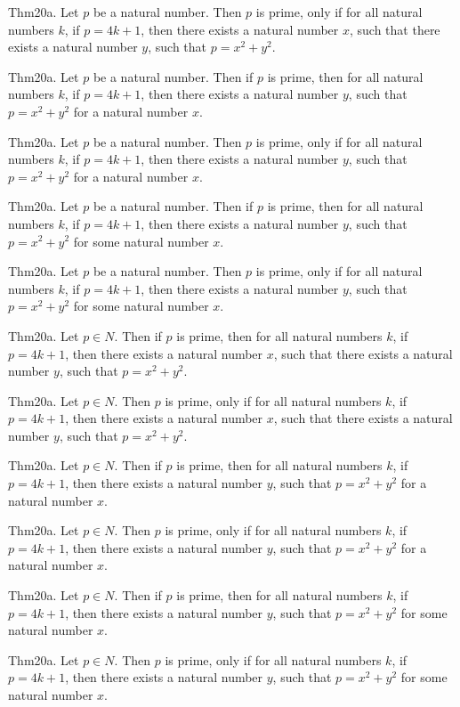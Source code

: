 \documentclass{article}
\begin{document}
Thm20a. Let $p$ be a natural number. Then $p$ is prime, only if for all natural numbers $k$, if $p = 4 k + 1$, then there exists a natural number $x$, such that there exists a natural number $y$, such that $p = x ^{ 2}+ y ^{ 2}$.

Thm20a. Let $p$ be a natural number. Then if $p$ is prime, then for all natural numbers $k$, if $p = 4 k + 1$, then there exists a natural number $y$, such that $p = x ^{ 2}+ y ^{ 2}$ for a natural number $x$.

Thm20a. Let $p$ be a natural number. Then $p$ is prime, only if for all natural numbers $k$, if $p = 4 k + 1$, then there exists a natural number $y$, such that $p = x ^{ 2}+ y ^{ 2}$ for a natural number $x$.

Thm20a. Let $p$ be a natural number. Then if $p$ is prime, then for all natural numbers $k$, if $p = 4 k + 1$, then there exists a natural number $y$, such that $p = x ^{ 2}+ y ^{ 2}$ for some natural number $x$.

Thm20a. Let $p$ be a natural number. Then $p$ is prime, only if for all natural numbers $k$, if $p = 4 k + 1$, then there exists a natural number $y$, such that $p = x ^{ 2}+ y ^{ 2}$ for some natural number $x$.

Thm20a. Let $p \in N$. Then if $p$ is prime, then for all natural numbers $k$, if $p = 4 k + 1$, then there exists a natural number $x$, such that there exists a natural number $y$, such that $p = x ^{ 2}+ y ^{ 2}$.

Thm20a. Let $p \in N$. Then $p$ is prime, only if for all natural numbers $k$, if $p = 4 k + 1$, then there exists a natural number $x$, such that there exists a natural number $y$, such that $p = x ^{ 2}+ y ^{ 2}$.

Thm20a. Let $p \in N$. Then if $p$ is prime, then for all natural numbers $k$, if $p = 4 k + 1$, then there exists a natural number $y$, such that $p = x ^{ 2}+ y ^{ 2}$ for a natural number $x$.

Thm20a. Let $p \in N$. Then $p$ is prime, only if for all natural numbers $k$, if $p = 4 k + 1$, then there exists a natural number $y$, such that $p = x ^{ 2}+ y ^{ 2}$ for a natural number $x$.

Thm20a. Let $p \in N$. Then if $p$ is prime, then for all natural numbers $k$, if $p = 4 k + 1$, then there exists a natural number $y$, such that $p = x ^{ 2}+ y ^{ 2}$ for some natural number $x$.

Thm20a. Let $p \in N$. Then $p$ is prime, only if for all natural numbers $k$, if $p = 4 k + 1$, then there exists a natural number $y$, such that $p = x ^{ 2}+ y ^{ 2}$ for some natural number $x$.
\end{document}
